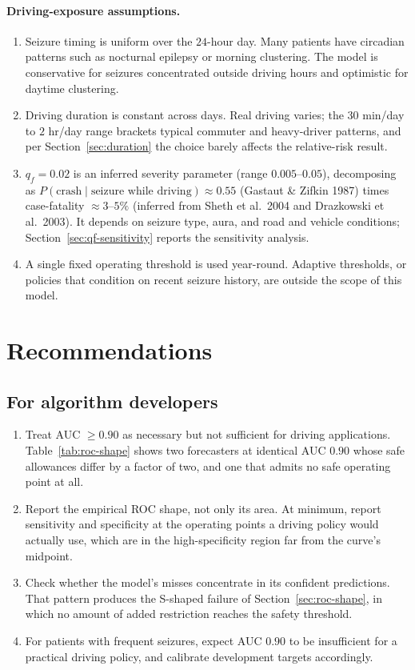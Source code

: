 \documentclass[11pt]{article}
\numberwithin{equation}{section}
\begin{document}
\paragraph{Driving-exposure assumptions.}
\begin{enumerate}[leftmargin=2em,itemsep=2pt]
  \item Seizure timing is uniform over the $24$-hour day. Many patients have circadian
  patterns such as nocturnal epilepsy or morning clustering. The model is conservative
  for seizures concentrated outside driving hours and optimistic for daytime clustering.
  \item Driving duration is constant across days. Real driving varies; the $30$ min/day
  to $2$ hr/day range brackets typical commuter and heavy-driver patterns, and per
  Section~\ref{sec:duration} the choice barely affects the relative-risk result.
  \item $q_f = 0.02$ is an inferred severity parameter (range $0.005$--$0.05$),
  decomposing as $P(\text{crash} \mid \text{seizure while driving}) \approx 0.55$
  (Gastaut \& Zifkin 1987) times case-fatality $\approx 3$--$5\%$ (inferred from Sheth
  et al.\ 2004 and Drazkowski et al.\ 2003). It depends on seizure type, aura, and road
  and vehicle conditions; Section~\ref{sec:qf-sensitivity} reports the sensitivity
  analysis.
  \item A single fixed operating threshold is used year-round. Adaptive thresholds, or
  policies that condition on recent seizure history, are outside the scope of this
  model.
\end{enumerate}

\section{Recommendations}
\label{sec:recommendations}

\subsection{For algorithm developers}
\label{sec:rec-dev}
\begin{enumerate}[leftmargin=2em,itemsep=2pt]
  \item Treat AUC $\ge 0.90$ as necessary but not sufficient for driving applications.
  Table~\ref{tab:roc-shape} shows two forecasters at identical AUC $0.90$ whose safe
  allowances differ by a factor of two, and one that admits no safe operating point at
  all.
  \item Report the empirical ROC shape, not only its area. At minimum, report
  sensitivity and specificity at the operating points a driving policy would actually
  use, which are in the high-specificity region far from the curve's midpoint.
  \item Check whether the model's misses concentrate in its confident predictions. That
  pattern produces the S-shaped failure of Section~\ref{sec:roc-shape}, in which no
  amount of added restriction reaches the safety threshold.
  \item For patients with frequent seizures, expect AUC $0.90$ to be insufficient for a
  practical driving policy, and calibrate development targets accordingly.
\end{enumerate}
\end{document}
